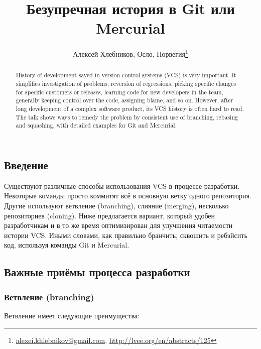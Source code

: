\documentclass[10pt, a5paper]{article}
\begin{document}
\title{Безупречная история в Git или Mercurial}
\author{Алексей Хлебников, Осло, Норвегия\footnote{\url{alexei.khlebnikov@gmail.com}, \url{http://lvee.org/en/abstracts/125}}}
\maketitle
\begin{abstract}
History of development saved in version control systems (VCS) is very important. It simplifies investigation of problems, reversion of regressions, picking specific changes for specific customers or releases, learning code for new developers in the team, generally keeping control over the code, assigning blame, and so on. However, after long development of a complex software product, its VCS history is often hard to read. The talk shows  ways to remedy the problem by consistent use of branching, rebasing and squashing, with detailed examples for Git and Mercurial.
\end{abstract}
\subsection*{Введение}

Существуют различные способы использования VCS в процессе разработки. Некоторые команды просто коммитят всё в основную ветку одного репозитория. Другие используют ветвление (branching), слияние (merging), несколько репозиториев (cloning). Ниже предлагается вариант, который удобен разработчикам и в то же время оптимизирован для улучшения читаемости истории VCS. Иными словами, как правильно бранчить, сквошить и ребэйсить код, используя команды Git и Mercurial.

\subsection*{Важные приёмы процесса разработки}

\subsubsection*{Ветвление (branching)}

Ветвление имеет следующие преимущества:
\end{document}
